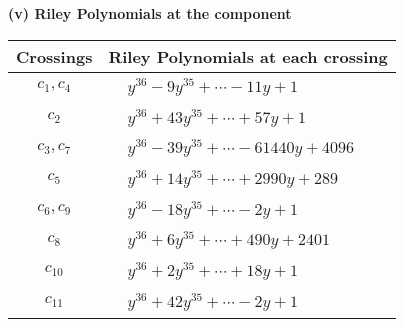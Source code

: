 \documentclass[1p]{elsarticle_modified}
\theoremstyle{definition}
\begin{document}
\newpage\renewcommand{\arraystretch}{1}
\flushleft \textbf{(v) Riley Polynomials at the component}\newline \\
\begin{tabular}{m{50pt}|m{274pt}}
Crossings & \hspace{64pt}Riley Polynomials at each crossing \\
\hline $$\begin{aligned}c_{1},c_{4}\end{aligned}$$&$\begin{aligned}
&y^{36}-9 y^{35}+\cdots-11 y+1
\end{aligned}$\\
\hline $$\begin{aligned}c_{2}\end{aligned}$$&$\begin{aligned}
&y^{36}+43 y^{35}+\cdots+57 y+1
\end{aligned}$\\
\hline $$\begin{aligned}c_{3},c_{7}\end{aligned}$$&$\begin{aligned}
&y^{36}-39 y^{35}+\cdots-61440 y+4096
\end{aligned}$\\
\hline $$\begin{aligned}c_{5}\end{aligned}$$&$\begin{aligned}
&y^{36}+14 y^{35}+\cdots+2990 y+289
\end{aligned}$\\
\hline $$\begin{aligned}c_{6},c_{9}\end{aligned}$$&$\begin{aligned}
&y^{36}-18 y^{35}+\cdots-2 y+1
\end{aligned}$\\
\hline $$\begin{aligned}c_{8}\end{aligned}$$&$\begin{aligned}
&y^{36}+6 y^{35}+\cdots+490 y+2401
\end{aligned}$\\
\hline $$\begin{aligned}c_{10}\end{aligned}$$&$\begin{aligned}
&y^{36}+2 y^{35}+\cdots+18 y+1
\end{aligned}$\\
\hline $$\begin{aligned}c_{11}\end{aligned}$$&$\begin{aligned}
&y^{36}+42 y^{35}+\cdots-2 y+1
\end{aligned}$\\
\hline
\end{tabular}\\~\\
\end{document}
